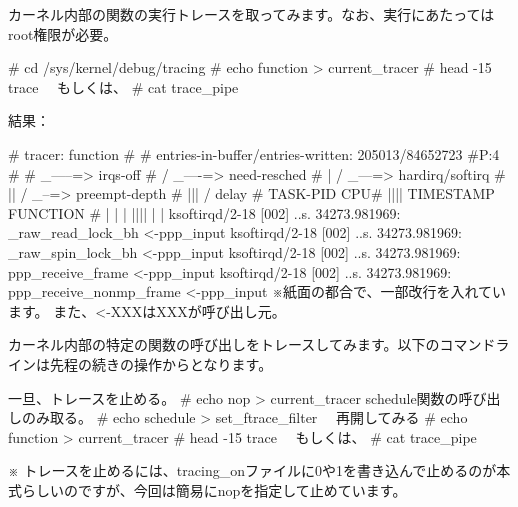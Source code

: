 \documentclass[mingoth,a4paper]{jsarticle}
\begin{document}
 カーネル内部の関数の実行トレースを取ってみます。なお、実行にあたってはroot権限が必要。
  
 \begin{commandline}
 # cd /sys/kernel/debug/tracing
 # echo function > current_tracer
 # head -15 trace　
   もしくは、
 # cat trace_pipe
 \end{commandline}   
 
結果：
 \begin{commandline}
# tracer: function
#
# entries-in-buffer/entries-written: 205013/84652723   #P:4
#
#                              _-----=> irqs-off
#                             / _----=> need-resched
#                            | / _---=> hardirq/softirq
#                            || / _--=> preempt-depth
#                            ||| /     delay
#           TASK-PID   CPU#  ||||    TIMESTAMP  FUNCTION
#              | |       |   ||||       |         |
     ksoftirqd/2-18    [002] ..s. 34273.981969: _raw_read_lock_bh
                                                     <-ppp_input
     ksoftirqd/2-18    [002] ..s. 34273.981969: _raw_spin_lock_bh
                                                     <-ppp_input
     ksoftirqd/2-18    [002] ..s. 34273.981969: ppp_receive_frame
                                                     <-ppp_input
     ksoftirqd/2-18    [002] ..s. 34273.981969: ppp_receive_nonmp_frame
                                                      <-ppp_input
※紙面の都合で、一部改行を入れています。 また、<-XXXはXXXが呼び出し元。
 \end{commandline}   

 カーネル内部の特定の関数の呼び出しをトレースしてみます。以下のコマンドラインは先程の続きの操作からとなります。
 \begin{commandline}
 一旦、トレースを止める。
 # echo nop > current_tracer
 schedule関数の呼び出しのみ取る。
 # echo schedule > set_ftrace_filter
　再開してみる
 # echo function > current_tracer
 # head -15 trace　
   もしくは、
 # cat trace_pipe
 \end{commandline}   
※ トレースを止めるには、tracing\_onファイルに0や1を書き込んで止めるのが本式らしいのですが、今回は簡易にnopを指定して止めています。
\end{document}
